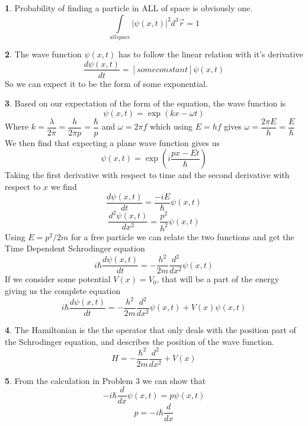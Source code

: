 \documentclass[11pt, twocolumn]{article}
\newcommand{\wave}{\psi (x,t)}
\newcommand{\dif}[2]{\frac{d#1}{d#2}}
\newcommand{\diff}[3]{\frac{d^#3 #1}{d #2^#3}}
\theoremstyle{definition}
\newtheorem{ans}{}
\begin{document}
	\begin{ans}
		Probability of finding a particle in ALL of space is obviously one. 
		\[ \int\limits_{all space} | \psi(x,t) | ^2 d^3\vec{r}= 1 \]
	\end{ans}
	\begin{ans}
		The wave function $ \wave $ has to follow the linear relation with it's derivative
		\[ \frac{d \wave}{dt} = [some constant] \wave \]
		So we can expect it to be the form of some exponential. 
	\end{ans}
	\begin{ans}
		Based on our expectation of the form of the equation, the wave function is
		\[ \wave = \exp(kx - \omega t) \]
		Where $ k = \dfrac{\lambda}{2 \pi} = \dfrac{h}{2 \pi p} = \dfrac{\hbar}{p}$ and $ \omega = 2 \pi f $ which using $ E = hf $ gives $ \omega = \dfrac{2 \pi E}{h} = \dfrac{E}{\hbar} $
		We then find that expecting a plane wave function gives us 
		\[ \wave = \exp(i\frac{px-Et}{\hbar}) \]
		Taking the first derivative with respect to time and the second derivative with respect to $ x $ we find
		\[ \dif{\wave}{t} =  \frac{-iE}{\hbar} \wave\]
		\[ \diff{\wave}{x}{2} = \frac{p^2}{h^2} \wave\]
		Using $ E = p^2/2m $ for a free particle we can relate the two functions and get the Time Dependent Schrodinger equation
		\[ i\hbar \dif{\wave}{t} = -\frac{h^2}{2m} \diff{}{x}{2} \wave \]
		If we consider some potential $ V(x) = V_0 $, that will be a part of the energy giving us the complete equation
		\[ i\hbar \dif{\wave}{t} = -\frac{h^2}{2m} \diff{}{x}{2} \wave + V(x)\wave\]
	\end{ans}
	\begin{ans}
		The Hamiltonian is the the operator that only deals with the position part of the Schrodinger equation, and describes the position of the wave function. 
		$$ H = -\frac{\hbar^2}{2m} \diff{}{x}{2}  + V(x) $$
	\end{ans}
	\begin{ans}
		From the calculation in Problem 3 we can show that
		\[ -i \hbar \dif{}{x} \wave = p \wave \]
		\[ p = -i\hbar \dif{}{x} \]
	\end{ans}
\end{document}
